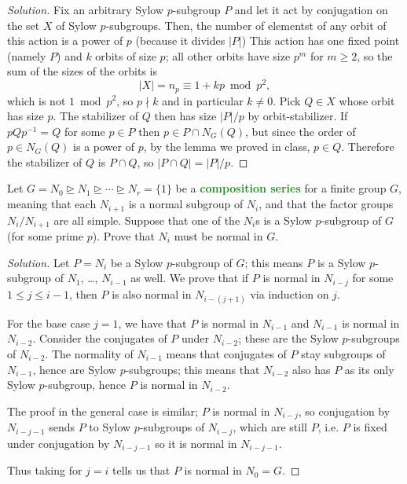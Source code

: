 \documentclass[10pt]{article}
\providecommand{\quiv}{\equiv}
\providecommand{\inv}{^{-1}}
\newenvironment{soln}{\begin{proof}[Solution]}{\end{proof}}
\providecommand{\vocab}[1]{{\textbf{\textcolor{ForestGreen}{#1}}}}
\providecommand{\abs}[1]{\left|#1\right|}
\begin{document}
\begin{soln}
    Fix an arbitrary Sylow $p$-subgroup $P$
    and let it act by conjugation on the set $X$ of Sylow $p$-subgroups.
    Then, the number of elementst of any orbit of this action
    is a power of $p$ (because it divides $\abs P$)
    This action has one fixed point (namely $P$)
    and $k$ orbits of size $p$; all other orbits have size
    $p^m$ for $m\ge 2$, so the sum of the sizes of the orbits is
    \begin{equation*}
	\abs X = n_p \quiv 1 + kp \bmod p^2,
    \end{equation*}
    which is not $1\bmod p^2$, so $p\nmid k$ and in particular $k\ne 0$.
    Pick $Q\in X$ whose orbit has size $p$.
    The stabilizer of $Q$ then has size $\abs P/p$ by orbit-stabilizer.
    If $pQp\inv = Q$ for some $p\in P$ then $p\in P\cap N_G(Q)$,
    but since the order of $p\in N_G(Q)$ is a power of $p$,
    by the lemma we proved in class, $p\in Q$. Therefore the stabilizer of $Q$
    is $P\cap Q$, so $\abs{P\cap Q} = \abs P/p$.
\end{soln}

\begin{problem}
    Let $G = N_0 \trianglerighteq N_1\trianglerighteq\cdots\trianglerighteq N_r=\{1\}$
    be a \vocab{composition series} for a finite group $G$, meaning that
    each $N_{i+1}$ is a normal subgroup of $N_i$, and that
    the factor groups $N_i/N_{i+1}$ are all simple.
    Suppose that one of the $N_i$s is a Sylow $p$-subgroup of $G$
    (for some prime $p$). Prove that $N_i$ must be normal in $G$.
\end{problem}

\begin{soln}
    Let $P = N_i$ be a Sylow $p$-subgroup of $G$;
    this means $P$ is a Sylow $p$-subgroup of $N_1$, \dots, $N_{i-1}$ as well.
    We prove that if $P$ is normal in $N_{i-j}$
    for some $1\le j\le i-1$, then $P$ is also normal in $N_{i-(j+1)}$
    via induction on $j$.

    For the base case $j=1$, we have that
    $P$ is normal in $N_{i-1}$ and $N_{i-1}$ is normal in $N_{i-2}$.
    Consider the conjugates of $P$ under $N_{i-2}$;
    these are the Sylow $p$-subgroups of $N_{i-2}$.
    The normality of $N_{i-1}$ means that conjugates of $P$
    stay subgroups of $N_{i-1}$, hence are Sylow $p$-subgroups;
    this means that $N_{i-2}$ also has $P$ as its only Sylow $p$-subgroup,
    hence $P$ is normal in $N_{i-2}$.

    The proof in the general case is similar;
    $P$ is normal in $N_{i-j}$, so conjugation by $N_{i-j-1}$
    sends $P$ to Sylow $p$-subgroups of $N_{i-j}$, which are still $P$,
    i.e. $P$ is fixed under conjugation by $N_{i-j-1}$ so it is normal in $N_{i-j-1}$.

    Thus taking for $j=i$ tells us that $P$ is normal in $N_0 = G$.
\end{soln}
\end{document}
